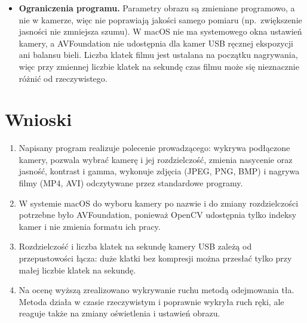 \begin{itemize}
    na zmianę oświetlenia, automatycznej ekspozycji kamery lub suwaków parametrów obrazu. Po takiej
    zmianie należy użyć przycisku \emph{Zapamiętaj tło od nowa}.
  \item \textbf{Ograniczenia programu.} Parametry obrazu są zmieniane programowo, a nie w kamerze,
    więc nie poprawiają jakości samego pomiaru (np.\ zwiększenie jasności nie zmniejsza szumu).
    W macOS nie ma systemowego okna ustawień kamery, a AVFoundation nie udostępnia dla kamer USB
    ręcznej ekspozycji ani balansu bieli. Liczba klatek filmu jest ustalana na początku nagrywania,
    więc przy zmiennej liczbie klatek na sekundę czas filmu może się nieznacznie różnić od
    rzeczywistego.
\end{itemize}

\section{Wnioski}
\begin{enumerate}
  \item Napisany program realizuje polecenie prowadzącego: wykrywa podłączone kamery, pozwala
    wybrać kamerę i jej rozdzielczość, zmienia nasycenie oraz jasność, kontrast i gamma, wykonuje
    zdjęcia (JPEG, PNG, BMP) i nagrywa filmy (MP4, AVI) odczytywane przez standardowe programy.
  \item W systemie macOS do wyboru kamery po nazwie i do zmiany rozdzielczości potrzebne było
    AVFoundation, ponieważ OpenCV udostępnia tylko indeksy kamer i nie zmienia formatu ich pracy.
  \item Rozdzielczość i liczba klatek na sekundę kamery USB zależą od przepustowości łącza: duże
    klatki bez kompresji można przesłać tylko przy małej liczbie klatek na sekundę.
  \item Na ocenę wyższą zrealizowano wykrywanie ruchu metodą odejmowania tła. Metoda działa
    w czasie rzeczywistym i poprawnie wykryła ruch ręki, ale reaguje także na zmiany oświetlenia
    i ustawień obrazu.
\end{enumerate}

